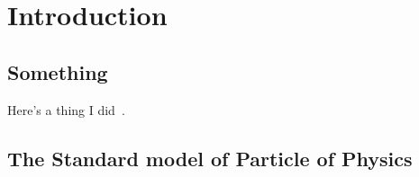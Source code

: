 \chapter{Introduction} 
\label{ch:introduction}

\minitoc
\section{Something}
Here's a thing I did~\cite{LHCb-PAPER-2017-032}. 


\section{The Standard model of Particle of Physics}


